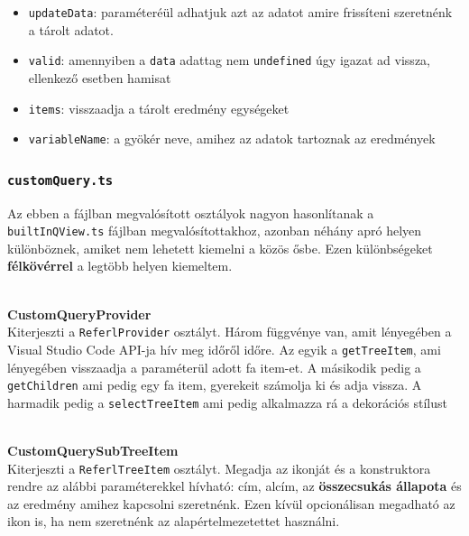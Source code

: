 \begin{itemize}
    \item \lstinline{updateData}: paraméteréül adhatjuk azt az adatot amire frissíteni szeretnénk a tárolt adatot.
    
    \item \lstinline{valid}: amennyiben a \lstinline{data} adattag nem \lstinline{undefined} úgy igazat ad vissza, ellenkező esetben hamisat
    
    \item \lstinline{items}: visszaadja a tárolt eredmény egységeket
    
    \item \lstinline{variableName}: a gyökér neve, amihez az adatok tartoznak az eredmények
    
    
\end{itemize}







\subsubsection{\lstinline{customQuery.ts}}

Az ebben a fájlban megvalósított osztályok nagyon hasonlítanak a \lstinline{builtInQView.ts} fájlban megvalósítottakhoz, azonban néhány apró helyen különböznek, amiket nem lehetett kiemelni a közös ősbe. Ezen különbségeket \textbf{félkövérrel} a legtöbb helyen kiemeltem.


\\
\vspace{14pt}
\textbf{CustomQueryProvider}
\\

Kiterjeszti a \lstinline{ReferlProvider} osztályt. Három függvénye van, amit lényegében a Visual Studio Code API-ja hív meg időről időre. Az egyik a \lstinline{getTreeItem}, ami lényegében visszaadja a paraméterül adott fa item-et. A másikodik pedig a \lstinline{getChildren} ami pedig egy fa item, gyerekeit számolja ki és adja vissza. A harmadik pedig a \lstinline{selectTreeItem} ami pedig alkalmazza rá a dekorációs stílust





\\
\vspace{14pt}
\textbf{CustomQuerySubTreeItem}
\\

Kiterjeszti a \lstinline{ReferlTreeItem} osztályt. Megadja az ikonját és a konstruktora rendre az alábbi paraméterekkel hívható: cím, alcím, az \textbf{összecsukás állapota} és az eredmény amihez kapcsolni szeretnénk. Ezen kívül opcionálisan megadható az ikon is, ha nem szeretnénk az alapértelmezetettet használni.





